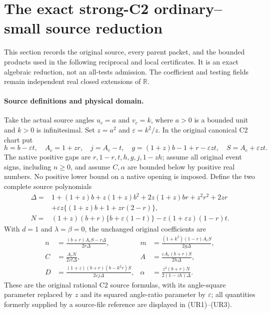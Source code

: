 \section[The exact strong-C2 ordinary--small source reduction]{The exact strong-C2 ordinary--small source reduction}
\label{sec:ui-full-parent-reduction}

This section records the original source, every parent packet, and the
bounded products used in the following reciprocal and local certificates.
It is an exact algebraic reduction, not an all-tests admission. The
coefficient and testing fields remain independent real closed extensions
of $\mathbb R$.

\paragraph{Source definitions and physical domain.}
Take the actual source angles $u_c=a$ and $v_c=k$, where $a>0$ is a
bounded unit and $k>0$ is infinitesimal. Set $z=a^2$ and
$\varepsilon=k^2/z$. In the original canonical C2 chart put
\[
 h=b-\varepsilon t,\quad A_c=1+zr,\quad j=A_c-t,\quad
 g=(1+z)b-1+r-\varepsilon zt,\quad S=A_c+\varepsilon zt.
 \tag{UR1}\label{eq:ui-source-gaps}
\]
The native positive gaps are $r,1-r,t,h,g,j,1-zh$; assume all original
event signs, including $n\ge0$, and assume $C,\alpha$ are bounded below
by positive real numbers. No positive lower bound on a native opening
is imposed. Define the two complete source polynomials
\begin{align*}
 \Delta={}&1+(1+z)b+z(1+z)b^2+2z(1+z)br+z^2r^2+2zr\\
 &+\varepsilon z\{(1+z)b+1+zr(2-r)\},\\
 N={}&(1+z)(b+r)\{b+\varepsilon(1-t)\}
          -\varepsilon(1+\varepsilon z)(1-r)t.
 \tag{UR2}\label{eq:ui-source-polynomials}
\end{align*}
With $d=1$ and $\lambda=\beta=0$, the unchanged original coefficients
are
\[
 \begin{aligned}
 n&=\frac{(b+r)A_cS-r\Delta}{2r\Delta},&
 m&=\frac{(1+k^2)(1-r)A_cS}{2g\Delta},\\
 C&=\frac{A_cN}{2\varepsilon t\Delta},&
 A&=\frac{\varepsilon A_c(b+r)S}{2h\Delta},\\
 D&=\frac{(1+z)(b+r)(b-k^2r)S}{2\varepsilon j\Delta},&
 \alpha&=\frac{z^2(b+r)N}{2(1-zh)\Delta}.
 \end{aligned}                                                   \tag{UR3}
 \label{eq:ui-original-source}
\]
These are the original rational C2 source formulas, with its angle-square
parameter replaced by $z$ and its squared angle-ratio parameter by
$\varepsilon$; all quantities formerly supplied by a source-file
reference are displayed in (UR1)--(UR3).

